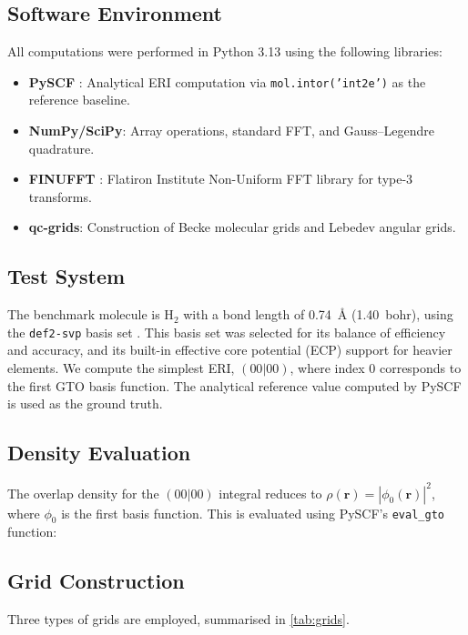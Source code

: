 \documentclass[12pt,a4paper]{article}
\begin{document}
\subsection{Software Environment}

All computations were performed in Python 3.13 using the following libraries:

\begin{itemize}
    \item \textbf{PySCF} \cite{sun2018}: Analytical ERI computation via \texttt{mol.intor('int2e')} as the reference baseline.
    \item \textbf{NumPy/SciPy}: Array operations, standard FFT, and Gauss--Legendre quadrature.
    \item \textbf{FINUFFT} \cite{barnett2019}: Flatiron Institute Non-Uniform FFT library for type-3 transforms.
    \item \textbf{qc-grids}: Construction of Becke molecular grids and Lebedev angular grids.
\end{itemize}

\subsection{Test System}

The benchmark molecule is H$_2$ with a bond length of 0.74~\AA{} (1.40~bohr), using the \texttt{def2-svp} basis set \cite{weigend2005}. This basis set was selected for its balance of efficiency and accuracy, and its built-in effective core potential (ECP) support for heavier elements. We compute the simplest ERI, $(00|00)$, where index 0 corresponds to the first GTO basis function. The analytical reference value computed by PySCF is used as the ground truth.

\subsection{Density Evaluation}

The overlap density for the $(00|00)$ integral reduces to $\rho(\mathbf{r}) = |\phi_0(\mathbf{r})|^2$, where $\phi_0$ is the first basis function. This is evaluated using PySCF's \texttt{eval\_gto} function:


\subsection{Grid Construction}
\label{sec:grid_construction}

Three types of grids are employed, summarised in \cref{tab:grids}.
\end{document}
